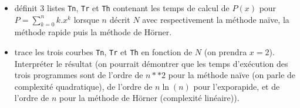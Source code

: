 
\begin{itemize}
\item définit 3 listes \lstinline{Tn}, \lstinline{Tr} et \lstinline{Th} contenant les temps de calcul de $P(x)$ pour $P=\sum_{k=0}^n k.x^k$ lorsque $n$ décrit $N$ avec respectivement la méthode naïve, la méthode rapide puis la méthode de Hörner.\\
\item trace les trois courbes  \lstinline{Tn}, \lstinline{Tr} et \lstinline{Th} en fonction de $N$ (on prendra $x=2$). Interpréter le résultat (on pourrait démontrer que les temps d'exécution des trois programmes sont de l'ordre de $n**2$ pour la méthode naïve (on parle de complexité quadratique), de l'ordre de $n\ln(n)$ pour l'exporapide, et de l'ordre de $n$ pour la méthode de Hörner (complexité linéaire)). 
\end{itemize}
	
